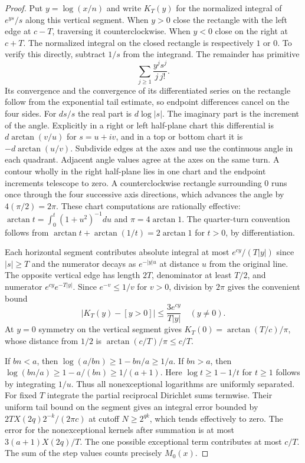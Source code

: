 \begin{proof}
Put $y=\log(x/n)$ and write $K_T(y)$ for the normalized integral
of $e^{ys}/s$ along this vertical segment. When $y>0$ close the
rectangle with the left edge at $c-T$, traversing it counterclockwise.
When $y<0$ close on the right at $c+T$. The normalized integral on
the closed rectangle is respectively $1$ or $0$. To verify this
directly, subtract $1/s$ from the integrand. The remainder has
primitive
\[
           \sum_{j\ge1} \frac{y^j s^j}{j\,j!}.
\]
Its convergence and the convergence of its differentiated series on
the rectangle follow from the exponential tail estimate, so endpoint
differences cancel on the four sides. For $ds/s$ the real part is
$d\log|s|$. The imaginary part is the increment of the angle.
Explicitly in a right or left half-plane chart this differential is
$d\arctan(v/u)$ for $s=u+iv$, and in a top or bottom chart it is
$-d\arctan(u/v)$. Subdivide edges at the axes and use the continuous
angle in each quadrant. Adjacent angle values agree at the axes on
the same turn. A contour wholly in the right half-plane lies in one
chart and the endpoint increments telescope to zero. A
counterclockwise rectangle surrounding $0$ runs once through the
four successive axis directions, which advances the angle by
$4(\pi/2)=2\pi$. These chart computations are rationally effective:
$\arctan t=\int_0^t(1+u^2)^{-1}du$ and $\pi=4\arctan 1$.
The quarter-turn convention follows from
$\arctan t+\arctan(1/t)=2\arctan 1$ for $t>0$, by differentiation.

Each horizontal segment contributes absolute integral at most
$e^{cy}/(T|y|)$ since $|s|\ge T$ and the numerator decays as
$e^{-|y|u}$ at distance $u$ from the original line. The opposite
vertical edge has length $2T$, denominator at least $T/2$, and
numerator $e^{cy}e^{-T|y|}$. Since $e^{-v}\le1/v$ for $v>0$,
division by $2\pi$ gives the convenient bound
\[
       |K_T(y)-[y>0]|\le \frac{3e^{cy}}{T|y|}\quad(y\ne0).
\]
At $y=0$ symmetry on the vertical segment gives
$K_T(0)=\arctan(T/c)/\pi$, whose distance from $1/2$ is
$\arctan(c/T)/\pi\le c/T$.

If $bn<a$, then $\log(a/bn)\ge1-bn/a\ge1/a$. If $bn>a$,
then $\log(bn/a)\ge1-a/(bn)\ge1/(a+1)$. Here
$\log t\ge1-1/t$ for $t\ge1$ follows by integrating $1/u$.
Thus all nonexceptional logarithms are uniformly separated.
For fixed $T$ integrate the partial reciprocal Dirichlet sums
termwise. Their uniform tail bound on the segment gives an integral
error bounded by $2T X(2q)2^{-k}/(2\pi c)$ at cutoff
$N\ge2^{qk}$, which tends effectively to zero. The error for the
nonexceptional kernels after summation is at most
$3(a+1)X(2q)/T$. The one possible exceptional term contributes
at most $c/T$. The sum of the step values counts precisely $M_0(x)$.
\end{proof}

